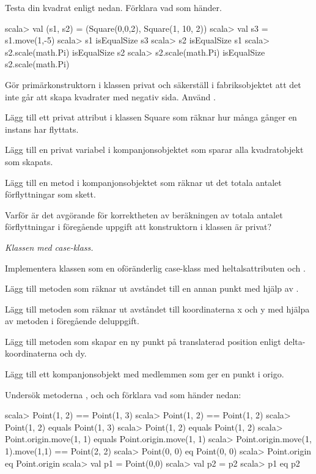 \Subtask Testa din kvadrat enligt nedan. Förklara vad som händer.

\begin{REPL}
scala> val (s1, s2) = (Square(0,0,2), Square(1, 10, 2))
scala> val s3 = s1.move(1,-5)
scala> s1 isEqualSize s3
scala> s2 isEqualSize s1
scala> s2.scale(math.Pi) isEqualSize s2
scala> s2.scale(math.Pi) isEqualSize s2.scale(math.Pi)
\end{REPL}

\Subtask Gör primärkonstruktorn i klassen  privat och säkerställ i fabriksobjektet att det inte går att skapa kvadrater med negativ sida. Använd .  

\Subtask Lägg till ett privat attribut  i klassen Square som räknar hur många gånger en instans har flyttats. 

\Subtask Lägg till en privat variabel  i kompanjonsobjektet som sparar alla kvadratobjekt som skapats.

\Subtask Lägg till en metod  i kompanjonsobjektet som räknar ut det totala antalet förflyttningar som skett.

\Subtask\Pen Varför är det avgörande för korrektheten av beräkningen av totala antalet förflyttningar i föregående uppgift att konstruktorn i klassen  är privat? 



\Task \label{task:Point} \emph{Klassen  med case-klass.} 

\Subtask Implementera klassen  som en oföränderlig case-klass med heltalsattributen  och . 

\Subtask Lägg till metoden  som räknar ut avståndet till en annan punkt med hjälp av .

\Subtask Lägg till metoden  som räknar ut avståndet till koordinaterna x och y med hjälpa av metoden i föregående deluppgift.

\Subtask Lägg till metoden  som skapar en ny punkt på translaterad position enligt delta-koordinaterna  och {dy}.

\Subtask Lägg till ett kompanjonsobjekt med medlemmen  som ger en punkt i origo.

\Subtask Undersök metoderna \code{==},  och  och förklara vad som händer nedan:
\begin{REPL}
scala> Point(1, 2) == Point(1, 3)
scala> Point(1, 2) == Point(1, 2)
scala> Point(1, 2) equals Point(1, 3)
scala> Point(1, 2) equals Point(1, 2)
scala> Point.origin.move(1, 1) equals Point.origin.move(1, 1)
scala> Point.origin.move(1, 1).move(1,1) == Point(2, 2)
scala> Point(0, 0) eq Point(0, 0)
scala> Point.origin eq Point.origin
scala> val p1 = Point(0,0)
scala> val p2 = p2
scala> p1 eq p2
\end{REPL}

